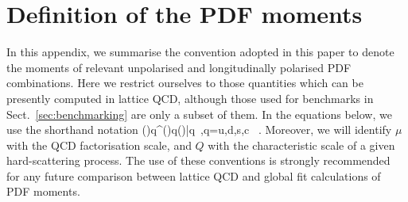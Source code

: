 \section{Definition of the PDF moments}
\label{app:notation}

In this appendix, we summarise the convention adopted in this paper to denote the
moments of relevant unpolarised and longitudinally polarised PDF combinations.
%
Here we restrict ourselves to those
quantities which can be presently computed in lattice QCD,
although those used for benchmarks in Sect.~\ref{sec:benchmarking} are only
a subset of them.
%
In the equations below, we use the shorthand notation
\be
(\Delta)q^\pm \equiv (\Delta)q\pm(\Delta)\bar{q}\, ,\qquad q=u,d,s,c \, .
\ee
Moreover, we will identify $\mu$  with the QCD factorisation scale,
and $Q$ with the characteristic scale of a given 
hard-scattering process.
%
The use of these conventions is strongly recommended for any future
comparison between lattice QCD and global fit calculations of PDF moments.

